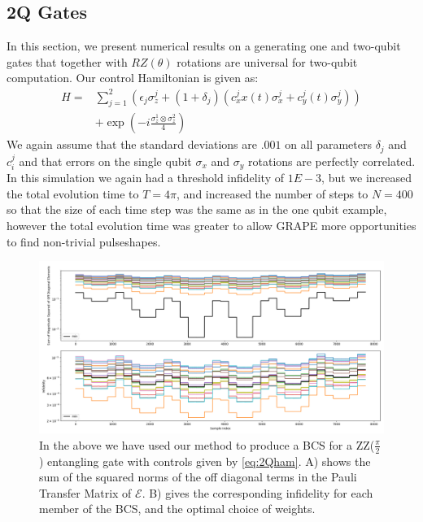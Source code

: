 \documentclass[aps,nofootinbib,pra,notitlepage,twocolumn]{revtex4-1}
\begin{document}
\subsection{2Q Gates}\label{2Q Gates}
 In this section, we present numerical results on a generating one and two-qubit gates that together with $RZ(\theta)$ rotations are universal for two-qubit computation. Our control Hamiltonian is given as: 
\begin{equation} \label{eq:2Qham}
\begin{split}
H = &\sum_{j=1}^2(\epsilon_j\sigma_z^j + (1 + \delta_j)(c_x^jx(t)\sigma_x^j + c_y^j(t)\sigma_y^j)) \\
&+ \exp{(-i\frac{\sigma_z^1\otimes\sigma_z^2}{4})} 
\end{split}
\end{equation}
We again assume that the standard deviations are $.001$ on all parameters $\delta_j$ and $c^j_i$ and that errors on the single qubit $\sigma_x$ and $\sigma_y$ rotations are perfectly correlated. In this simulation we again had a threshold infidelity of $1E-3$, but we increased the total evolution time to $T=4\pi$, and increased the number of steps to $N=400$ so that the size of each time step was the same as in the one qubit example, however the total evolution time was greater to allow GRAPE more opportunities to find non-trivial pulseshapes. 
\begin{figure}[t]
\centering
\includegraphics[width=\textwidth]{2Q.png}
\caption{In the above we have used our method to produce a BCS for a ZZ($\frac{\pi}{2}$) entangling gate with controls given by \ref{eq:2Qham}. A) shows the sum of the squared norms of the off diagonal terms in the Pauli Transfer Matrix of $\mathcal{E}$. B) gives the corresponding infidelity for each member of the BCS, and the optimal choice of weights.}
\end{figure}
\end{document}
